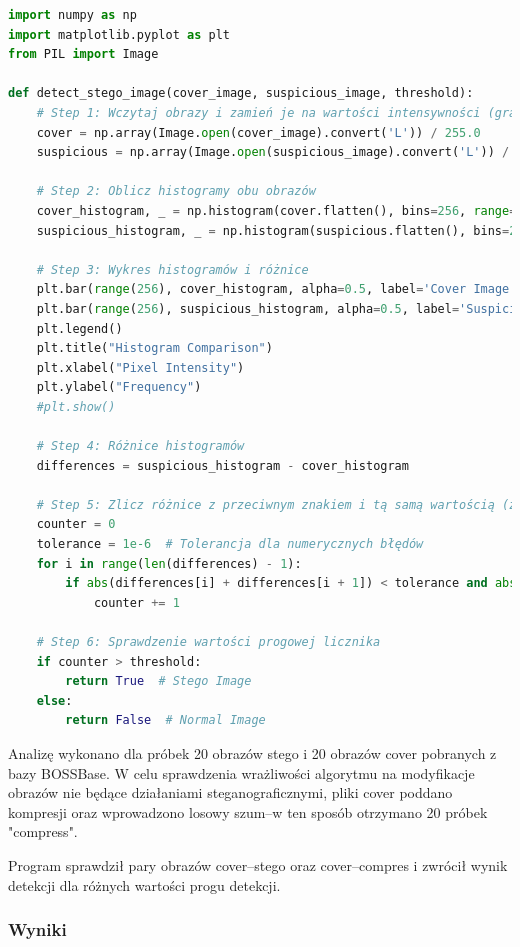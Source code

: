 \begin{lstlisting}[language=Python, caption=Steganaliza oparta na histogramach w Pythonie]
import numpy as np
import matplotlib.pyplot as plt
from PIL import Image

def detect_stego_image(cover_image, suspicious_image, threshold):
    # Step 1: Wczytaj obrazy i zamień je na wartości intensywności (grayscale)
    cover = np.array(Image.open(cover_image).convert('L')) / 255.0
    suspicious = np.array(Image.open(suspicious_image).convert('L')) / 255.0

    # Step 2: Oblicz histogramy obu obrazów
    cover_histogram, _ = np.histogram(cover.flatten(), bins=256, range=(0, 1))
    suspicious_histogram, _ = np.histogram(suspicious.flatten(), bins=256, range=(0, 1))

    # Step 3: Wykres histogramów i różnice
    plt.bar(range(256), cover_histogram, alpha=0.5, label='Cover Image Histogram')
    plt.bar(range(256), suspicious_histogram, alpha=0.5, label='Suspicious Image Histogram')
    plt.legend()
    plt.title("Histogram Comparison")
    plt.xlabel("Pixel Intensity")
    plt.ylabel("Frequency")
    #plt.show()

    # Step 4: Różnice histogramów
    differences = suspicious_histogram - cover_histogram

    # Step 5: Zlicz różnice z przeciwnym znakiem i tą samą wartością (z tolerancją)
    counter = 0
    tolerance = 1e-6  # Tolerancja dla numerycznych błędów
    for i in range(len(differences) - 1):
        if abs(differences[i] + differences[i + 1]) < tolerance and abs(differences[i]) > 0:
            counter += 1

    # Step 6: Sprawdzenie wartości progowej licznika
    if counter > threshold:
        return True  # Stego Image
    else:
        return False  # Normal Image
\end{lstlisting}

Analizę wykonano dla próbek 20 obrazów stego i 20 obrazów cover pobranych z bazy BOSSBase. W celu sprawdzenia
wrażliwości algorytmu na modyfikacje obrazów nie będące działaniami steganograficznymi, pliki cover poddano
kompresji oraz wprowadzono losowy szum--w ten sposób otrzymano 20 próbek "compress".

Program sprawdził pary obrazów cover--stego oraz cover--compres i zwrócił wynik detekcji dla różnych
wartości progu detekcji.

\subsubsection{Wyniki}

